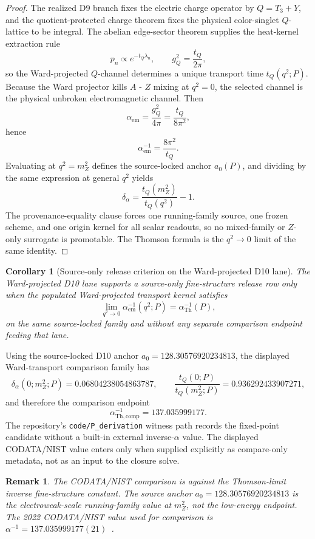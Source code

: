 \documentclass[11pt]{article}
\newtheorem{corollary}[theorem]{Corollary}
\newtheorem{remark}[theorem]{Remark}
\begin{document}
\begin{proof}
The realized D9 branch fixes the electric charge operator by \(Q=T_3+Y\), and the
quotient-protected charge theorem fixes the physical color-singlet \(Q\)-lattice to be integral.
The abelian edge-sector theorem supplies the heat-kernel extraction rule
\[
p_n\propto e^{-t_Q\lambda_n},
\qquad
g_Q^2=\frac{t_Q}{2\pi},
\]
so the Ward-projected \(Q\)-channel determines a unique transport time \(t_Q(q^2;P)\). Because
the Ward projector kills \(A\) - \(Z\) mixing at \(q^2=0\), the selected channel is the physical
unbroken electromagnetic channel. Then
\[
\alpha_{\mathrm{em}}=\frac{g_Q^2}{4\pi}=\frac{t_Q}{8\pi^2},
\]
hence
\[
\alpha_{\mathrm{em}}^{-1}=\frac{8\pi^2}{t_Q}.
\]
Evaluating at \(q^2=m_Z^2\) defines the source-locked anchor \(a_0(P)\), and dividing by the same
expression at general \(q^2\) yields
\[
\delta_\alpha=\frac{t_Q(m_Z^2)}{t_Q(q^2)}-1.
\]
The provenance-equality clause forces one running-family source, one frozen scheme, and one origin
kernel for all scalar readouts, so no mixed-family or \(Z\)-only surrogate is promotable. The
Thomson formula is the \(q^2\to0\) limit of the same identity.
\end{proof}

\begin{corollary}[Source-only release criterion on the Ward-projected D10 lane]
The Ward-projected D10 lane supports a source-only fine-structure release row only when the populated
Ward-projected transport kernel satisfies
\[
\lim_{q^2\to0}\alpha_{\mathrm{em}}^{-1}(q^2;P)=\alpha_{\mathrm{Th}}^{-1}(P),
\]
on the same source-locked family and without any separate comparison endpoint feeding that lane.
\end{corollary}

Using the source-locked D10 anchor \(a_0=128.30576920234813\), the displayed
Ward-transport comparison family has
\[
\delta_\alpha(0;m_Z^2;P)=0.06804238054863787,
\qquad
\frac{t_Q(0;P)}{t_Q(m_Z^2;P)}=0.936292433907271,
\]
and therefore the comparison endpoint
\[
\alpha_{\mathrm{Th,comp}}^{-1}=137.035999177.
\]
The repository's \texttt{code/P\_derivation} witness path records the fixed-point candidate without
a built-in external inverse-\(\alpha\) value. The displayed CODATA/NIST value enters only when
supplied explicitly as compare-only metadata, not as an input to the closure solve.

\begin{remark}
The CODATA/NIST comparison is against the Thomson-limit inverse fine-structure constant. The
source anchor \(a_0=128.30576920234813\) is the electroweak-scale running-family value at
\(m_Z^2\), not the low-energy endpoint. The 2022 CODATA/NIST value used for comparison is
\(\alpha^{-1}=137.035999177(21)\)~\cite{codata2022}.
\end{remark}
\end{document}
